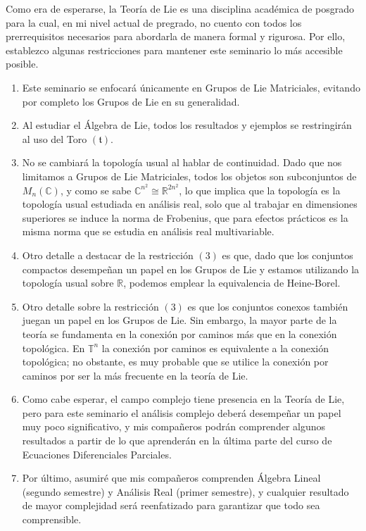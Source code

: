 \begin{assignment}[
  header=HeaderA,
  body=BodyA,
  title={Guia de Seminario Algebra Moderna},
  duedate={\today},
  toc=false,
  toctitle={},
  exlist=false
]
Como era de esperarse, la Teoría de Lie es una disciplina académica de posgrado para la cual, en mi nivel actual de pregrado, no cuento con todos los prerrequisitos necesarios para abordarla de manera formal y rigurosa. Por ello, establezco algunas restricciones para mantener este seminario lo más accesible posible.
\begin{enumerate}
    \item Este seminario se enfocará únicamente en Grupos de Lie Matriciales, evitando por completo los Grupos de Lie en su generalidad.
    \item Al estudiar el Álgebra de Lie, todos los resultados y ejemplos se restringirán al uso del Toro $(\mathfrak{t})$.
    \item No se cambiará la topología usual al hablar de continuidad. Dado que nos limitamos a Grupos de Lie Matriciales, todos los objetos son subconjuntos de $M_n(\mathbb{C})$, y como se sabe $\mathbb{C}^{n^2} \cong \mathbb{R}^{2n^2}$, lo que implica que la topología es la topología usual estudiada en análisis real, solo que al trabajar en dimensiones superiores se induce la norma de Frobenius, que para efectos prácticos es la misma norma que se estudia en análisis real multivariable.
    \item Otro detalle a destacar de la restricción $(3)$ es que, dado que los conjuntos compactos desempeñan un papel en los Grupos de Lie y estamos utilizando la topología usual sobre $\mathbb{R}$, podemos emplear la equivalencia de Heine-Borel.
    \item Otro detalle sobre la restricción $(3)$ es que los conjuntos conexos también juegan un papel en los Grupos de Lie. Sin embargo, la mayor parte de la teoría se fundamenta en la conexión por caminos más que en la conexión topológica. En $\mathbb{T}^n$ la conexión por caminos es equivalente a la conexión topológica; no obstante, es muy probable que se utilice la conexión por caminos por ser la más frecuente en la teoría de Lie.
    \item Como cabe esperar, el campo complejo tiene presencia en la Teoría de Lie, pero para este seminario el análisis complejo deberá desempeñar un papel muy poco significativo, y mis compañeros podrán comprender algunos resultados a partir de lo que aprenderán en la última parte del curso de Ecuaciones Diferenciales Parciales.
    \item Por último, asumiré que mis compañeros comprenden Álgebra Lineal (segundo semestre) y Análisis Real (primer semestre), y cualquier resultado de mayor complejidad será reenfatizado para garantizar que todo sea comprensible.
\end{enumerate}





\end{assignment}
